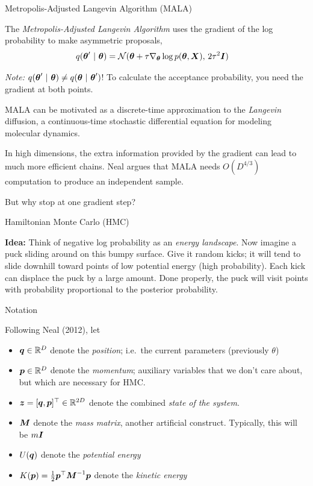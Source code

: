 \documentclass[aspectratio=169]{beamer}
\begin{document}
\begin{frame}[t,allowframebreaks]{Metropolis-Adjusted Langevin Algorithm
(MALA)}\label{metropolis-adjusted-langevin-algorithm-mala}

The \emph{Metropolis-Adjusted Langevin Algorithm} uses the gradient of
the log probability to make asymmetric proposals, \begin{align*}
    q(\boldsymbol{\theta}' ~\vert~ \boldsymbol{\theta}) &= \mathcal{N}(\boldsymbol{\theta} + \tau \nabla_{\boldsymbol{\theta}} \log p(\boldsymbol{\theta}, \boldsymbol{X}), \, 2\tau^2 \boldsymbol{I}) 
\end{align*}

\emph{Note:}
\(q(\boldsymbol{\theta}' ~\vert~ \boldsymbol{\theta}) \neq q(\boldsymbol{\theta} ~\vert~ \boldsymbol{\theta}')\)! To
calculate the acceptance probability, you need the gradient at both
points.

MALA can be motivated as a discrete-time approximation to the
\emph{Langevin} diffusion, a continuous-time stochastic differential
equation for modeling molecular dynamics.

In high dimensions, the extra information provided by the gradient can
lead to much more efficient chains. Neal argues that MALA needs
\(O(D^{4/3})\) computation to produce an independent sample.

But why stop at one gradient step?
\end{frame}

\begin{frame}[t,allowframebreaks]{Hamiltonian Monte Carlo
(HMC)}\label{hamiltonian-monte-carlo-hmc}

\textbf{Idea:} Think of negative log probability as an \emph{energy
landscape}. Now imagine a puck sliding around on this bumpy surface.
Give it random kicks; it will tend to slide downhill toward points of
low potential energy (high probability). Each kick can displace the puck
by a large amount. Done properly, the puck will visit points with
probability proportional to the posterior probability.
\end{frame}

\begin{frame}[t,allowframebreaks]{Notation}\label{notation}

Following Neal (2012), let

\begin{itemize}
\item
  \(\boldsymbol{q} \in \mathbb{R}^D\) denote the \emph{position}; i.e.~the current
  parameters (previously \(\theta\))
\item
  \(\boldsymbol{p} \in \mathbb{R}^D\) denote the \emph{momentum}; auxiliary variables
  that we don't care about, but which are necessary for HMC.
\item
  \(\boldsymbol{z} = [\boldsymbol{q}, \boldsymbol{p}]^\top \in \mathbb{R}^{2D}\) denote the combined
  \emph{state of the system}.
\item
  \(\boldsymbol{M}\) denote the \emph{mass matrix}, another artificial construct.
  Typically, this will be \(m \boldsymbol{I}\)
\item
  \(U(\boldsymbol{q})\) denote the \emph{potential energy}
\item
  \(K(\boldsymbol{p}) = \frac{1}{2} \boldsymbol{p}^\top \boldsymbol{M}^{-1} \boldsymbol{p}\) denote the
  \emph{kinetic energy}
\end{itemize}
\end{frame}
\end{document}
